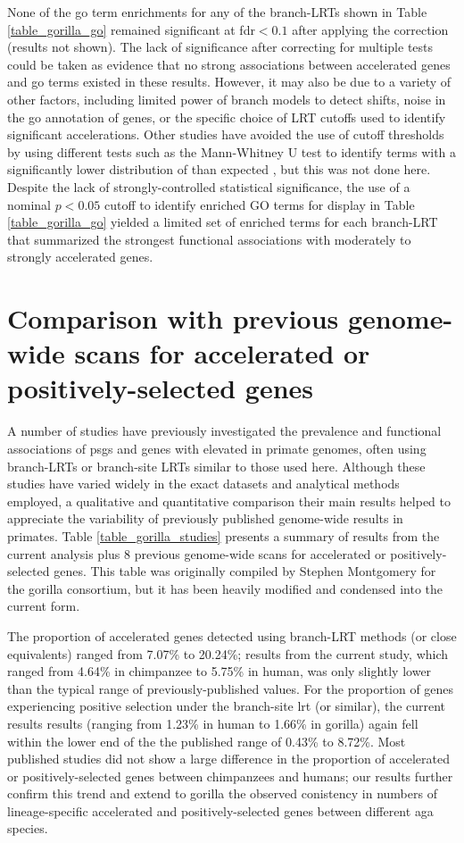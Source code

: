 None of the \ac{go} term enrichments for any of the branch-LRTs shown
in Table \ref{table_gorilla_go} remained significant at \ac{fdr}$<0.1$
after applying the \citet{Benjamini1995} correction (results not
shown). The lack of significance after correcting for multiple tests
could be taken as evidence that no strong associations between
accelerated genes and \ac{go} terms existed in these results. However,
it may also be due to a variety of other factors, including limited
power of branch models to detect \dnds shifts, noise in the \ac{go}
annotation of genes, or the specific choice of LRT cutoffs used to
identify significant accelerations. Other studies have avoided the use
of cutoff thresholds by using different tests such as the Mann-Whitney
U test to identify terms with a significantly lower distribution of
\pvs than expected \citep{Clark2003,Kosiol2008}, but this was not done
here. Despite the lack of strongly-controlled statistical
significance, the use of a nominal $p<0.05$ cutoff to identify
enriched GO terms for display in Table \ref{table_gorilla_go} yielded
a limited set of enriched terms for each branch-LRT that summarized
the strongest functional associations with moderately to strongly
accelerated genes.

\section{Comparison with previous genome-wide scans for accelerated or positively-selected genes}

A number of studies have previously investigated the prevalence and
functional associations of \acp{psg} and genes with elevated \dnds in
primate genomes, often using branch-LRTs or branch-site LRTs similar
to those used here. Although these studies have varied widely in the
exact datasets and analytical methods employed, a qualitative and
quantitative comparison their main results helped to appreciate the
variability of previously published genome-wide results in
primates. Table \ref{table_gorilla_studies} presents a summary of
results from the current analysis plus 8 previous genome-wide scans
for accelerated or positively-selected genes. This table was
originally compiled by Stephen Montgomery for the gorilla consortium,
but it has been heavily modified and condensed into the current form.

The proportion of accelerated genes detected using branch-LRT methods
(or close equivalents) ranged from 7.07\% to 20.24\%; results from the
current study, which ranged from 4.64\% in chimpanzee to 5.75\% in
human, was only slightly lower than the typical range of
previously-published values. For the proportion of genes experiencing
positive selection under the branch-site \ac{lrt} (or similar), the
current results results (ranging from 1.23\% in human to 1.66\% in
gorilla) again fell within the lower end of the the published range of
0.43\% to 8.72\%. Most published studies did not show a large
difference in the proportion of accelerated or positively-selected
genes between chimpanzees and humans; our results further confirm this
trend and extend to gorilla the observed conistency in numbers of
lineage-specific accelerated and positively-selected genes between
different \ac{aga} species.

